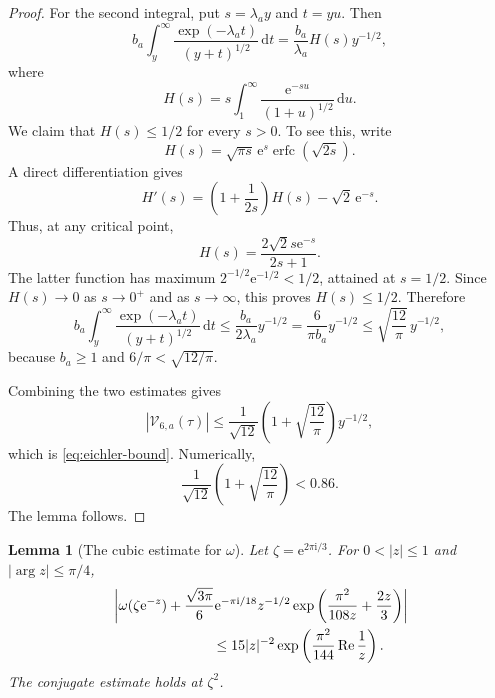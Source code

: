 \documentclass[11pt]{article}
\newtheorem{lemma}[theorem]{Lemma}
\theoremstyle{remark}
\newcommand{\ii}{\mathrm i}
\newcommand{\e}{\mathrm e}
\newcommand{\dd}{\mathrm d}
\newcommand{\Repart}{\operatorname{Re}}
\begin{document}
\begin{proof}
For the second integral, put $s=\lambda_a y$ and $t=yu$.  Then
\[
b_a\int_y^\infty
\frac{\exp(-\lambda_a t)}{(y+t)^{1/2}}\,\dd t
=
\frac{b_a}{\lambda_a}
H(s)y^{-1/2},
\]
where
\[
H(s)=s\int_1^\infty \frac{\e^{-su}}{(1+u)^{1/2}}\,\dd u.
\]
We claim that $H(s)\leq1/2$ for every $s>0$.  To see this, write
\[
H(s)=\sqrt{\pi s}\,\e^s\operatorname{erfc}(\sqrt{2s}).
\]
A direct differentiation gives
\[
H'(s)=\left(1+\frac1{2s}\right)H(s)-\sqrt2\,\e^{-s}.
\]
Thus, at any critical point,
\[
H(s)=\frac{2\sqrt2s\e^{-s}}{2s+1}.
\]
The latter function has maximum $2^{-1/2}\e^{-1/2}<1/2$, attained at $s=1/2$.  Since $H(s)\to0$ as $s\to0^+$ and as $s\to\infty$, this proves $H(s)\leq1/2$.
Therefore
\[
b_a\int_y^\infty
\frac{\exp(-\lambda_a t)}{(y+t)^{1/2}}\,\dd t
\leq
\frac{b_a}{2\lambda_a}y^{-1/2}
=
\frac{6}{\pi b_a}y^{-1/2}
\leq
\sqrt{\frac{12}{\pi}}\,y^{-1/2},
\]
because $b_a\geq1$ and $6/\pi<\sqrt{12/\pi}$.

Combining the two estimates gives
\[
|\mathcal V_{6,a}(\tau)|
\leq
\frac1{\sqrt{12}}
\left(1+\sqrt{\frac{12}{\pi}}\right)y^{-1/2},
\]
which is \eqref{eq:eichler-bound}.  Numerically,
\[
\frac1{\sqrt{12}}
\left(1+\sqrt{\frac{12}{\pi}}\right)<0.86.
\]
The lemma follows.
\end{proof}


\begin{lemma}[The cubic estimate for $\omega$]\label{lem:cubic-omega}
Let $\zeta=\e^{2\pi\ii/3}$.  For $0<|z|\leq1$ and
$|\arg z|\leq\pi/4$,
\begin{align}\label{eq:omega-cubic-est}
&\left|
\omega(\zeta\e^{-z})
+
\frac{\sqrt{3\pi}}6\e^{-\pi\ii/18}z^{-1/2}
\exp\left(\frac{\pi^2}{108z}+\frac{2z}{3}\right)
\right|  \\
&\hspace{1.0in}\leq
15 |z|^{-2}\exp\left(\frac{\pi^2}{144}\Repart\frac1z\right).
\end{align}
The conjugate estimate holds at $\zeta^2$.
\end{lemma}
\end{document}
